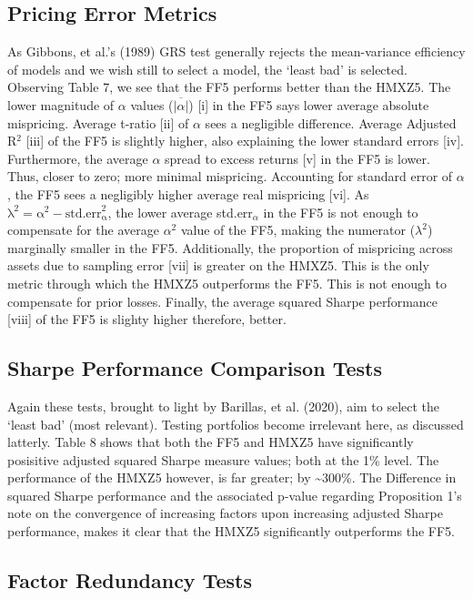 \documentclass[11pt, english]{article}
\begin{document}
	\subsection{Pricing Error Metrics}

	As Gibbons, et al.'s (1989) GRS test generally rejects the mean-variance efficiency of models and we wish still to select a model, the `least bad' is selected. Observing Table 7, we see that the FF5 performs better than the HMXZ5. The lower magnitude of $\alpha$ values ($\overline{|\alpha|}$) [i] in the FF5 says lower average absolute mispricing. Average t-ratio [ii] of $\alpha$ sees a negligible difference. Average Adjusted R$^2$ [iii] of the FF5 is slightly higher, also explaining the lower standard errors [iv]. Furthermore, the average $\alpha$ spread to excess returns [v] in the FF5 is lower. Thus, closer to zero; more minimal mispricing. Accounting for standard error of $\alpha$, the FF5 sees a negligibly higher average real mispricing [vi]. As $\mathrm{\lambda^2=\alpha^2-\textrm{std.err}_{\alpha}^2}$, the lower average std.err$_{\alpha}$ in the FF5 is not enough to compensate for the average $\alpha^2$ value of the FF5, making the numerator ($\lambda^2$) marginally smaller in the FF5. Additionally, the proportion of mispricing across assets due to sampling error [vii] is greater on the HMXZ5. This is the only metric through which the HMXZ5 outperforms the FF5. This is not enough to compensate for prior losses. Finally, the average squared Sharpe performance [viii] of the FF5 is slighty higher therefore, better.
	
	\subsection{Sharpe Performance Comparison Tests}

	Again these tests, brought to light by Barillas, et al. (2020), aim to select the `least bad' (most relevant). Testing portfolios become irrelevant here, as discussed latterly. Table 8 shows that both the FF5 and HMXZ5 have significantly posisitive adjusted squared Sharpe measure values; both at the 1\% level. The performance of the HMXZ5 however, is far greater; by \~{}300\%. The Difference in squared Sharpe performance and the associated p-value regarding Proposition 1's note on the convergence of increasing factors upon increasing adjusted Sharpe performance, makes it clear that the HMXZ5 significantly outperforms the FF5.
	
	\subsection{Factor Redundancy Tests}
\end{document}
